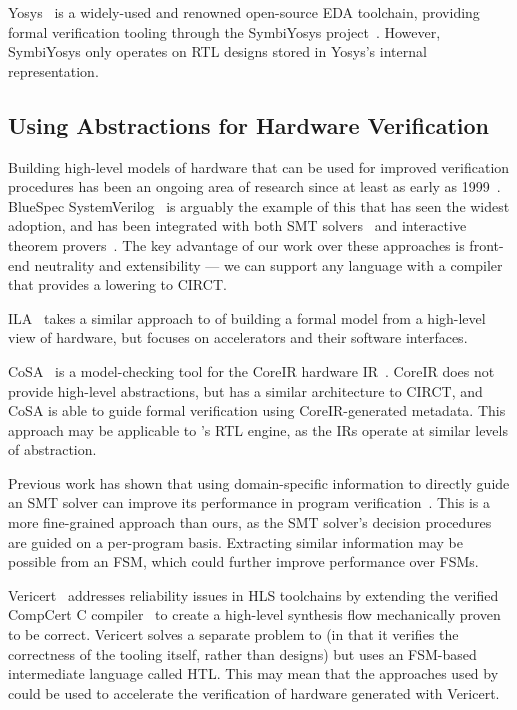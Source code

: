 \documentclass[acmsmall,screen,review]{acmart}
\begin{document}
Yosys~\cite{yosys} is a widely-used and renowned open-source EDA toolchain, providing formal verification tooling through the SymbiYosys project~\cite{symbiyosys}.
However, SymbiYosys only operates on RTL designs stored in Yosys's internal representation.

\subsection{Using Abstractions for Hardware Verification}

Building high-level models of hardware that can be used for improved
verification procedures has been an ongoing area of research since at least as early as
1999~\cite{arvind1999trs}. BlueSpec SystemVerilog~\cite{bluespec} is arguably
the example of this that has seen the widest adoption, and has been integrated
with both SMT solvers~\cite{bluespec_smt} and interactive theorem
provers~\cite{bluespec_itp, koika}. The key advantage of our work over these approaches
is front-end neutrality and extensibility --- we can support any language
with a compiler that provides a lowering to CIRCT.

ILA~\cite{huang2018instruction} takes a similar approach to \toolname{} of building
a formal model from a high-level view of hardware, but focuses on
accelerators and their software interfaces.

CoSA~\cite{mattarei2018cosa} is a model-checking tool for the CoreIR hardware
IR~\cite{daly2018coreir}. CoreIR does not provide high-level abstractions, but
has a similar architecture to CIRCT, and CoSA is able to guide formal
verification using CoreIR-generated metadata. This approach may be applicable to
\toolname{}'s RTL engine, as the IRs operate at similar levels of abstraction.

Previous work has shown that using domain-specific information to directly guide
an SMT solver can improve its performance in program verification~\cite{chen2021leveraging}. This is a more fine-grained approach than ours, as
the SMT solver's decision procedures are guided on a per-program basis.
Extracting similar information may be possible from an FSM, which could further
improve performance over FSMs.

Vericert~\cite{herklotz2021vericert} addresses reliability issues in HLS toolchains by extending the verified CompCert C compiler~\cite{leroy2009compcert} to create a high-level synthesis flow mechanically proven to be correct.
Vericert solves a separate problem to \toolname{} (in that it verifies the correctness of the tooling itself, rather than designs) but uses an FSM-based intermediate language called HTL.
This may mean that the approaches used by \toolname{} could be used to accelerate the verification of hardware generated with Vericert.
\end{document}
